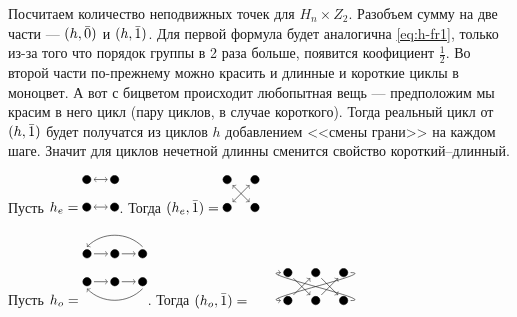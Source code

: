 Посчитаем количество неподвижных точек для $H_n \times Z_2$. Разобъем
сумму на две части --- $(h, \Bar 0)$ и $(h, \Bar 1)$. Для первой формула будет
аналогична \ref{eq:h-fr1}, только из-за того что порядок группы в 2 раза больше,
появится коофициент $\frac{1}{2}$. 
Во второй части по-прежнему можно красить и длинные и короткие циклы в моноцвет.
А вот с бицветом происходит любопытная вещь --- предположим мы красим в него
цикл (пару циклов, в случае короткого). Тогда реальный цикл от $(h, \Bar 1)$
будет получатся из циклов $h$ добавлением <<смены грани>> на каждом шаге. 
Значит для циклов нечетной длинны сменится свойство короткий--длинный. 
\begin{example}
Пусть $h_e = 
\begin{tikzpicture}
\draw [<->] (5pt, 0pt) -- (15pt, 0pt);
\draw [<->] (5pt, 20pt) -- (15pt, 20pt);
\draw[fill] (0pt,0pt) circle (3pt);
\draw[fill] (0pt, 20pt) circle (3pt);
\draw[fill] (20pt, 0pt) circle (3pt);
\draw[fill] (20pt, 20pt) circle (3pt);
\end{tikzpicture}
$.
Тогда $(h_e, \Bar 1) = 
\begin{tikzpicture}
\draw [<->] (4pt, 4pt) -- (16pt, 16pt);
\draw [<->] (4pt, 16pt) -- (16pt, 4pt);
\draw[fill] (0pt,0pt) circle (3pt);
\draw[fill] (0pt, 20pt) circle (3pt);
\draw[fill] (20pt, 0pt) circle (3pt);
\draw[fill] (20pt, 20pt) circle (3pt);
\end{tikzpicture}
$
\end{example}
\begin{example}
Пусть $h_o = 
\begin{tikzpicture}
\draw [->] (5pt, 0pt) -- (15pt, 0pt);
\draw [->] (5pt, 20pt) -- (15pt, 20pt);
\draw [->] (25pt, 0pt) -- (35pt, 0pt);
\draw [->] (25pt, 20pt) -- (35pt, 20pt);
\draw [->] (40pt, -5pt) to [out=-135,in=-45] (0pt, -5pt);
\draw [->] (40pt, 25pt) to [out=135,in=45] (0pt, 25pt);
 
\draw[fill] (0pt,0pt) circle (3pt);
\draw[fill] (0pt, 20pt) circle (3pt);
\draw[fill] (20pt, 0pt) circle (3pt);
\draw[fill] (20pt, 20pt) circle (3pt);
\draw[fill] (40pt, 0pt) circle (3pt);
\draw[fill] (40pt, 20pt) circle (3pt);
\end{tikzpicture}
$.
Тогда $(h_o, \Bar 1) = 
\begin{tikzpicture}
\draw [->] (4pt, 4pt) -- (16pt, 16pt);
\draw [->] (4pt, 16pt) -- (16pt, 4pt);
\draw [->] (24pt, 4pt) -- (36pt, 16pt);
\draw [->] (24pt, 16pt) -- (36pt, 4pt);
\draw [->] (45pt, 20pt) to [out=0,in=180] (-5pt, 0pt);
\draw [->] (45pt, 0pt) to [out=0,in=180] (-5pt, 20pt);
 
\draw[fill] (0pt,0pt) circle (3pt);
\draw[fill] (0pt, 20pt) circle (3pt);
\draw[fill] (20pt, 0pt) circle (3pt);
\draw[fill] (20pt, 20pt) circle (3pt);
\draw[fill] (40pt, 0pt) circle (3pt);
\draw[fill] (40pt, 20pt) circle (3pt);
\end{tikzpicture}
$
\end{example}

